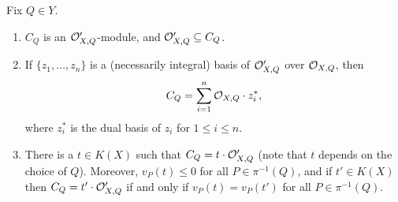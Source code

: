     \begin{prop}\label{factsaboutc'}
    Fix $Q\in Y$. 
        \begin{enumerate}
        \item $C_Q$ is an ${\cal O}_{X,Q}'$-module, and ${\cal O}_{X,Q}' \subseteq C_Q$.
        \item If $\{z_1,\ldots ,z_n\}$ is a (necessarily integral) basis of ${\cal O}_{X,Q}'$ over ${\cal O}_{X,Q}$, then 
        \[
        C_Q = \sum_{i=1}^n {\cal O}_{X,Q}\cdot z_i^*,
        \]
        where $z_i^*$ is the dual basis of $z_i$ for $1\leq i \leq n$.
        \item There is a $t\in K(X)$ such that $C_Q = t\cdot {\cal O}_{X,Q}'$ (note that $t$ depends on the choice of $Q$).
        Moreover, $v_P(t) \leq 0$ for all $P\in \pi^{-1}(Q)$, and if $t'\in K(X)$ then $C_Q=t'\cdot {\cal O}_{X,Q}'$ if and only if $v_P(t) = v_P(t')$ for all $P\in \pi^{-1}(Q)$.
        
        \end{enumerate}
    \end{prop}
